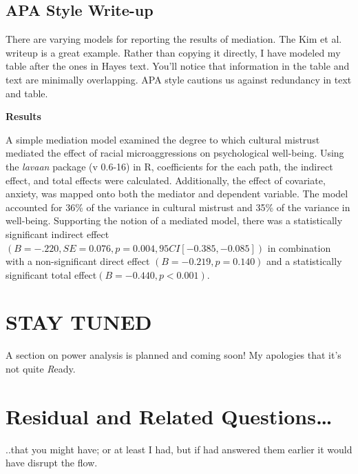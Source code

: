 \documentclass[
  11pt,
]{book}
\begin{document}
\hypertarget{apa-style-write-up}{%
\subsection{APA Style Write-up}\label{apa-style-write-up}}

There are varying models for reporting the results of mediation. The Kim et al. \citep{kim_racial_2017} writeup is a great example. Rather than copying it directly, I have modeled my table after the ones in Hayes \citeyearpar{hayes_introduction_2018} text. You'll notice that information in the table and text are minimally overlapping. APA style cautions us against redundancy in text and table.

\textbf{Results}

A simple mediation model examined the degree to which cultural mistrust mediated the effect of racial microaggressions on psychological well-being. Using the \emph{lavaan} package (v 0.6-16) in R, coefficients for the each path, the indirect effect, and total effects were calculated. Additionally, the effect of covariate, anxiety, was mapped onto both the mediator and dependent variable. The model accounted for 36\% of the variance in cultural mistrust and 35\% of the variance in well-being. Supporting the notion of a mediated model, there was a statistically significant indirect effect \((B = -.220, SE = 0.076, p = 0.004, 95CI[-0.385,-0.085])\) in combination with a non-significant direct effect \((B = -0.219, p = 0.140)\) and a statistically significant total effect\((B = -0.440, p < 0.001)\).

\hypertarget{stay-tuned}{%
\section{STAY TUNED}\label{stay-tuned}}

A section on power analysis is planned and coming soon! My apologies that it's not quite \emph{R}eady.

\hypertarget{residual-and-related-questions}{%
\section{Residual and Related Questions\ldots{}}\label{residual-and-related-questions}}

..that you might have; or at least I had, but if had answered them earlier it would have disrupt the flow.
\end{document}
